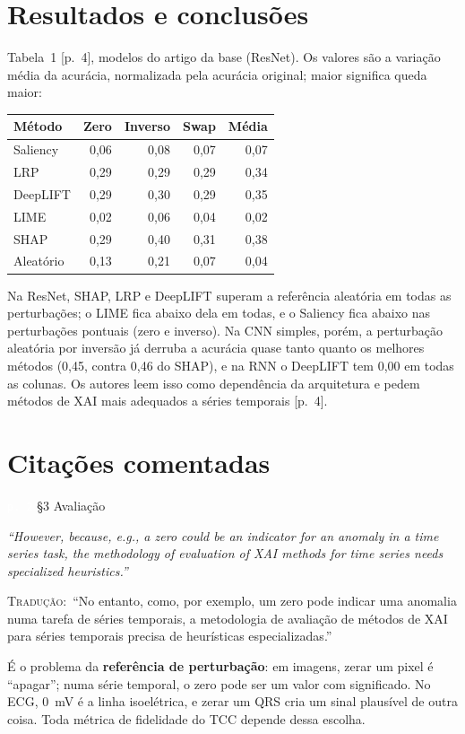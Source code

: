 \documentclass[11pt,a4paper]{article}
\newcommand{\pagechip}[1]{{\setlength{\fboxsep}{1.5pt}\colorbox{cAcc}{\textcolor{white}{\scriptsize\texttt{#1}}}}}
\newenvironment{origquote}{\par\itshape\small}{\par}
\newenvironment{tradquote}{\par\small\textsc{Tradução:}\ }{\par}
\newcommand{\explab}[1]{\par\smallskip{\small\color{cAcc}\textbf{\MakeUppercase{#1}}}\par}
\begin{document}
\section{Resultados e conclusões}
Tabela~1 [p.~4], modelos do artigo da base (ResNet). Os valores são a variação média da acurácia, normalizada pela acurácia original; maior significa queda maior:
\begin{center}\small
\begin{tabular}{lrrrr}
\toprule
\textbf{Método} & \textbf{Zero} & \textbf{Inverso} & \textbf{Swap} & \textbf{Média} \\
\midrule
Saliency & 0,06 & 0,08 & 0,07 & 0,07 \\
LRP & 0,29 & 0,29 & 0,29 & 0,34 \\
DeepLIFT & 0,29 & 0,30 & 0,29 & 0,35 \\
LIME & 0,02 & 0,06 & 0,04 & 0,02 \\
SHAP & 0,29 & 0,40 & 0,31 & 0,38 \\
Aleatório & 0,13 & 0,21 & 0,07 & 0,04 \\
\bottomrule
\end{tabular}
\end{center}
Na ResNet, SHAP, LRP e DeepLIFT superam a referência aleatória em todas as perturbações; o LIME fica abaixo dela em todas, e o Saliency fica abaixo nas perturbações pontuais (zero e inverso). Na CNN simples, porém, a perturbação aleatória por inversão já derruba a acurácia quase tanto quanto os melhores métodos (0,45, contra 0,46 do SHAP), e na RNN o DeepLIFT tem 0,00 em todas as colunas. Os autores leem isso como dependência da arquitetura e pedem métodos de XAI mais adequados a séries temporais [p.~4].

\section{Citações comentadas}

\begin{citacard}{\pagechip{p. 2} §3 Avaliação}
\begin{origquote}“However, because, e.g., a zero could be an indicator for an anomaly in a time series task, the methodology of evaluation of XAI methods for time series needs specialized heuristics.”\end{origquote}
\begin{tradquote}“No entanto, como, por exemplo, um zero pode indicar uma anomalia numa tarefa de séries temporais, a metodologia de avaliação de métodos de XAI para séries temporais precisa de heurísticas especializadas.”\end{tradquote}
\explab{Explicação}
É o problema da \textbf{referência de perturbação}: em imagens, zerar um pixel é “apagar”; numa série temporal, o zero pode ser um valor com significado. No ECG, 0~mV é a linha isoelétrica, e zerar um QRS cria um sinal plausível de outra coisa. Toda métrica de fidelidade do TCC depende dessa escolha.
\end{citacard}
\end{document}
